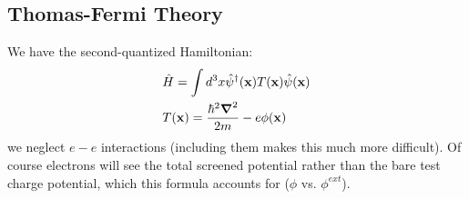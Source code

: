 \subsection{Thomas-Fermi Theory}
We have the second-quantized Hamiltonian:
\begin{equation}
    \begin{split}
        &\hat{H} = \int d^3x\hat{\psi}^\dag(\v{x})T(\v{x})\hat{\psi}(\v{x})
        \\ &T(\v{x}) = \frac{\hbar^2\nabla^2}{2m} - e\phi(\v{x})
    \end{split}
\end{equation}
we neglect $e-e$ interactions (including them makes this much more difficult). Of course electrons will see the total screened potential rather than the bare test charge potential, which this formula accounts for ($\phi$ vs. $\phi^{ext}$). 

